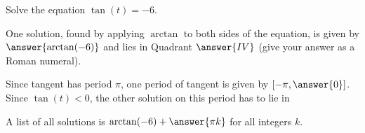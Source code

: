 \documentclass{ximera}
\author{Kenneth Berglund}
\begin{document}
\begin{exercise}
Solve the equation $\tan(t) = -6$. 

One solution, found by applying $\arctan$ to both sides of the equation, is given by $\answer{\arctan(-6)}$ and lies in Quadrant $\answer{IV}$ (give your answer as a Roman numeral). 

\begin{exercise}
Since tangent has period $\pi$, one period of tangent is given by $[-\pi, \answer{0}]$. Since $\tan(t) < 0$, the other solution on this period has to lie in 
\begin{multipleChoice}
\end{multipleChoice} 

\begin{exercise}
A list of all solutions is $\arctan(-6) + \answer{\pi k}$ for all integers $k$. 
\end{exercise}
\end{exercise}

\end{exercise}
\end{document}
